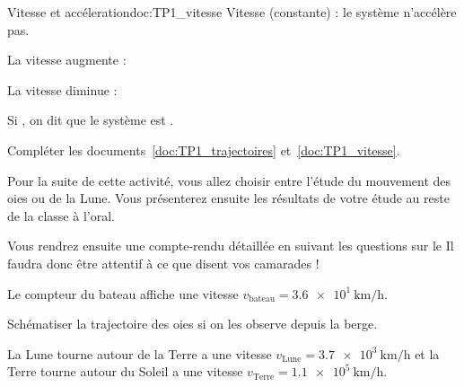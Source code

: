 \begin{doc}{Vitesse et accéleration}{doc:TP1_vitesse}
  Vitesse  (constante) : le système n’accélère pas.
  
  La vitesse augmente : 
  
  La vitesse diminue : 
  
  Si , on dit que le système est .
\end{doc}



\numeroQuestion
Compléter les documents~\ref{doc:TP1_trajectoires} et~\ref{doc:TP1_vitesse}.

\fleche Pour la suite de cette activité, vous allez choisir entre l'étude du mouvement des oies ou de la Lune.
Vous présenterez ensuite les résultats de votre étude au reste de la classe à l'oral.

\fleche Vous rendrez ensuite une compte-rendu détaillée en suivant les questions sur le 
Il faudra donc être attentif à ce que disent vos camarades !


\pasCorrection{\newpage}

Le compteur du bateau affiche une vitesse $v_\text{bateau} = \qty{3,6e1}{\km/\hour}$.



\mesure Schématiser la trajectoire des oies si on les observe depuis la berge.



La Lune tourne autour de la Terre a une vitesse $v_\text{Lune} = \qty{3,7e3}{\km/\hour}$
et la Terre tourne autour du Soleil a une vitesse $v_\text{Terre} = \qty{1,1e5}{\km/\hour}$.


